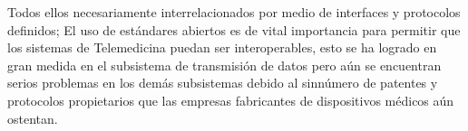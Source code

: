 Todos ellos necesariamente interrelacionados por medio de interfaces y protocolos definidos; El uso de estándares abiertos es de vital importancia para permitir que los sistemas de Telemedicina puedan ser interoperables, esto se ha logrado en gran medida en el subsistema de transmisión de datos pero aún se encuentran serios problemas en los demás subsistemas debido al sinnúmero de patentes y protocolos propietarios que las empresas fabricantes de dispositivos médicos aún ostentan.